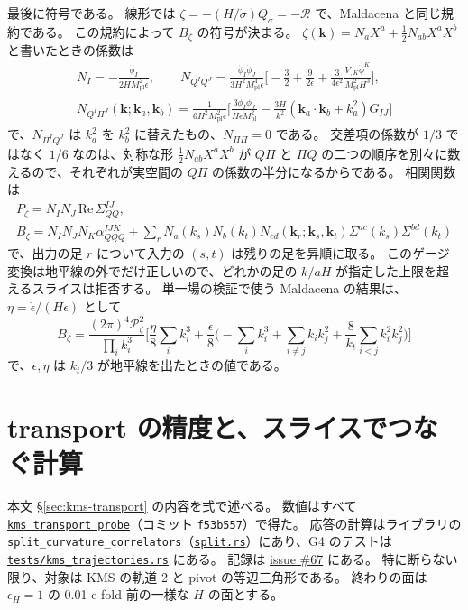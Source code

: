 \documentclass[a4paper,11pt]{ltjsarticle}
\newcommand{\Mpl}{M_{\mathrm{pl}}}
\newcommand{\code}[1]{\texttt{#1}}
\newcommand{\repourl}{https://github.com/inuverse44/phys-type}
\begin{document}
最後に符号である。
線形では $\zeta=-(H/\dot\sigma)Q_\sigma=-\mathcal R$ で、Maldacena\cite{Maldacena2003} と同じ規約である。
この規約によって $B_\zeta$ の符号が決まる。
$\zeta(\mathbf k)=N_aX^a+\tfrac12N_{ab}X^aX^b$ と書いたときの係数は
\begin{gather*}
N_I=-\frac{\dot\phi_I}{2H\Mpl^2\epsilon},\qquad
N_{Q^IQ^J}=\frac{\dot\phi_I\dot\phi_J}{3H^2\Mpl^4\epsilon}\Big[-\frac32+\frac9{2\epsilon}+\frac3{4\epsilon^2}\frac{V_{,K}\dot\phi^K}{\Mpl^2H^3}\Big],\\
N_{Q^I\Pi^J}(\mathbf k;\mathbf k_a,\mathbf k_b)=\frac{1}{6H^2\Mpl^2\epsilon}\Big[\frac{3\dot\phi_I\dot\phi_J}{H\epsilon\Mpl^2}-\frac{3H}{k^2}(\mathbf k_a\!\cdot\!\mathbf k_b+k_a^2)G_{IJ}\Big]
\end{gather*}
で、$N_{\Pi^IQ^J}$ は $k_a^2$ を $k_b^2$ に替えたもの、$N_{\Pi\Pi}=0$ である。
交差項の係数が $1/3$ ではなく $1/6$ なのは、対称な形 $\tfrac12N_{ab}X^aX^b$ が $Q\Pi$ と $\Pi Q$ の二つの順序を別々に数えるので、それぞれが実空間の $Q\Pi$ の係数の半分になるからである。
相関関数は
\begin{gather*}
P_\zeta=N_IN_J\,\mathrm{Re}\,\Sigma_{QQ}^{IJ},\\
B_\zeta=N_IN_JN_K\alpha_{QQQ}^{IJK}+\sum_rN_a(k_s)N_b(k_t)N_{cd}(\mathbf k_r;\mathbf k_s,\mathbf k_t)\Sigma^{ac}(k_s)\Sigma^{bd}(k_t)
\end{gather*}
で、出力の足 $r$ について入力の $(s,t)$ は残りの足を昇順に取る。
このゲージ変換は地平線の外でだけ正しいので、どれかの足の $k/aH$ が指定した上限を超えるスライスは拒否する。
単一場の検証で使う Maldacena の結果は、$\eta=\dot\epsilon/(H\epsilon)$ として
\[
B_\zeta=\frac{(2\pi)^4\mathcal P_\zeta^2}{\prod_ik_i^3}\Big[\frac\eta8\sum_ik_i^3+\frac\epsilon8\Big(-\sum_ik_i^3+\sum_{i\neq j}k_ik_j^2+\frac8{k_t}\sum_{i<j}k_i^2k_j^2\Big)\Big]
\]
で、$\epsilon,\eta$ は $k_t/3$ が地平線を出たときの値である。

\section{transport の精度と、スライスでつなぐ計算}
\label{app:conditioning}

本文 \S\ref{sec:kms-transport} の内容を式で述べる。
数値はすべて \href{\repourl/blob/f53b557/crates/phys-type-models/examples/kms_transport_probe.rs}{\texttt{kms\_transport\_probe}}（コミット \code{f53b557}）で得た。
応答の計算はライブラリの \code{split\_curvature\_correlators}（\href{\repourl/blob/main/crates/phys-type/src/split.rs}{\texttt{split.rs}}）にあり、G4 のテストは \href{\repourl/blob/main/crates/phys-type-models/tests/kms_trajectories.rs}{\texttt{tests/kms\_trajectories.rs}} にある。
記録は \href{\repourl/issues/67}{issue \#67} にある。
特に断らない限り、対象は KMS の軌道 2 と pivot の等辺三角形である。
終わりの面は $\epsilon_H=1$ の 0.01 e-fold 前の一様な $H$ の面とする。
\end{document}
